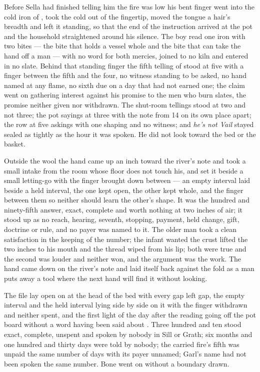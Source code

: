 Before Sella had finished telling him the fire was low his bent finger went into the cold iron of , took the cold out of the fingertip, moved the tongue a hair's breadth and left it standing, so that the end of the instruction arrived at the pot and the household straightened around his silence. The boy read one iron with two bites --- the bite that holds a vessel whole and the bite that can take the hand off a man --- with no  word for both mercies, joined to no kiln and entered in no slate. Behind that standing finger the fifth telling of  stood at five with a finger between the fifth and the four, no witness standing to be asked, no hand named at any flame, no sixth due on a day that had not earned one; the claim went on gathering interest against his promise to the men who burn slates, the promise neither given nor withdrawn. The shut-room tellings stood at two and not three; the pot sayings at three with the note from  14 on its own place apart; the row at five askings with one shaping and no witness; and \emph{he's not Vail} stayed sealed as tightly as the hour it was spoken. He did not look toward the bed or the basket.

Outside the wool the hand came up an inch toward the river's note and took a small intake from the room whose floor does not touch his, and set it beside a small letting-go with the finger brought down between --- an empty interval laid beside a held interval, the one kept open, the other kept whole, and the finger between them so neither should learn the other's shape. It was the hundred and ninety-fifth answer, exact, complete and worth nothing at two inches of air; it stood up as no reach, hearing, seventh, stopping, payment, held change, gift, doctrine or rule, and no payer was named to it. The older man took a clean satisfaction in the keeping of the number; the infant wanted the crust lifted the two inches to his mouth and the thread wiped from his lip; both were true and the second was louder and neither won, and the argument was the work. The hand came down on the river's note and laid itself back against the fold as a man puts away a tool where the next hand will find it without looking.

The file lay open on  at the head of the bed with every gap left gap, the empty interval and the held interval lying side by side on it with the finger withdrawn and neither spent, and the first light of the day after the reading going off the pot board without a word having been said about . Three hundred and ten stood exact, complete, unspent and spoken by nobody in Sill or Grath; six months and one hundred and thirty days were told by nobody; the carried fire's fifth was unpaid the same number of days with its payer unnamed; Garl's name had not been spoken the same number. Bone went on without a boundary drawn.
